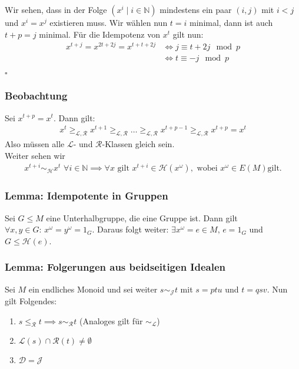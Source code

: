 \documentclass[12pt, german]{article}
\newcommand{\N}{\mathbb{N}}
\newcommand{\pom}{^{\omega}}
\newcommand{\grel}{\sim_{\mathcal{L}}}
\newcommand{\grer}{\sim_{\mathcal{R}}}
\newcommand{\grej}{\sim_{\mathcal{J}}}
\newcommand{\greh}{\sim_{\mathcal{H}}}
\newcommand{\lgrereq}{\leqslant_{\mathcal{R}}}
\newcommand{\bewiesen}{
	
	\begin{flushright}
		$\square$  \\
\end{flushright}}
\begin{document}
	Wir sehen, dass in der Folge $( x^i \mid i \in \N)$ mindestens ein paar $(i,j)$ mit $i < j$ und $x^i = x^j$ existieren muss. Wir wählen nun $t=i$ minimal, dann ist auch $t+p = j$ minimal. 
	Für die Idempotenz von $x^t$ gilt nun:
	\begin{align*}
		x^{t+j} = x^{2t + 2j} = x^{t + t + 2j} 
		&\iff j \equiv t + 2j \mod p \\
		&\iff t \equiv -j \mod p
	\end{align*}
	\bewiesen
	
	\subsubsection{Beobachtung}
	Sei $x^{t+p} = x^t$. Dann gilt: 
	\begin{align*}
		x^t \geqslant_{\mathcal{L, R}} x^{t+1} \geqslant_{\mathcal{L, R}} \ldots \geqslant_{\mathcal{L, R}} x^{t+p-1} \geqslant_{\mathcal{L, R}} x^{t+p} = x^t
	\end{align*}
	Also müssen alle $\mathcal{L}$- und $\mathcal{R}$-Klassen gleich sein.\\
	Weiter sehen wir
	\begin{align*}
		x^{t+i} \greh x^t \, \, \forall i \in \N 
		\implies \forall x \text{ gilt } x^{t+i} \in \mathcal{H}(x\pom), \text{ wobei } x\pom \in E(M) \text{gilt.}
	\end{align*}
	
	\subsubsection{Lemma: Idempotente in Gruppen}
	Sei $G \leq M$ eine Unterhalbgruppe, die eine Gruppe ist. 
	Dann gilt $\forall x,y \in G:\, x\pom = y\pom = 1_G$.
	Daraus folgt weiter: $\exists x\pom = e \in M, \, e = 1_G$ und $ G \leq \mathcal H(e)$.
	
	
	\subsubsection{Lemma: Folgerungen aus beidseitigen Idealen}
	\label{sec:jklassen}
	Sei $M$ ein endliches Monoid und sei weiter $s \grej t$ mit $s = ptu$ und $t=qsv$. Nun gilt Folgendes: 
	\begin{enumerate}[label = \alph*)]
		\item $s \lgrereq t \implies s \grer t$ (Analoges gilt für $\grel$)
		\item $\mathcal{L}(s) \cap \mathcal{R}(t) \not = \emptyset$
		\item $\mathcal{D} = \mathcal{J}$
	\end{enumerate}
	
\end{document}
